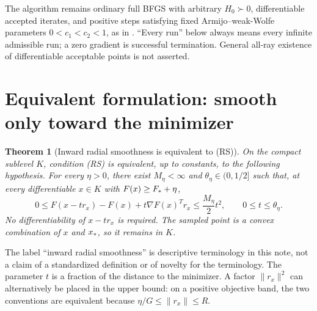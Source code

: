\documentclass[10pt,oneside,openany]{book}
\newtheorem{theorem}{Theorem}[chapter]
\theoremstyle{remark}\newtheorem{remark}{Remark}[chapter]
\begin{document}
The algorithm remains ordinary full BFGS with arbitrary $H_0\succ0$, differentiable accepted iterates, and positive steps satisfying fixed Armijo--weak-Wolfe parameters $0<c_1<c_2<1$, as in \cite{XW}. ``Every run'' below always means every infinite admissible run; a zero gradient is successful termination. General all-ray existence of differentiable acceptable points is not asserted.


\setcounter{section}{1}
\setcounter{theorem}{0}
\setcounter{equation}{1}
\section{Equivalent formulation: smooth only toward the minimizer}
\begin{theorem}[Inward radial smoothness is equivalent to (RS)]\label{R:thm:equiv}
On the compact sublevel $K$, condition (RS) is equivalent, up to constants, to the following hypothesis. For every $\eta>0$, there exist $M_\eta<\infty$ and $\theta_\eta\in(0,1/2]$ such that, at every differentiable $x\in K$ with $F(x)\ge F_*+\eta$,
\begin{equation}
 0\le F(x-t r_x)-F(x)+t\nabla F(x)^Tr_x
 \le \frac{M_\eta}{2}t^2,
 \qquad 0\le t\le\theta_\eta.
 \tag{R.IR}\label{R:eq:IR}
\end{equation}
No differentiability of $x-t r_x$ is required. The sampled point is a convex combination of $x$ and $x_*$, so it remains in $K$.
\end{theorem}
The label ``inward radial smoothness'' is descriptive terminology in this note, not a claim of a standardized definition or of novelty for the terminology. The parameter $t$ is a fraction of the distance to the minimizer. A factor $\|r_x\|^2$ can alternatively be placed in the upper bound: on a positive objective band, the two conventions are equivalent because $\eta/G\le\|r_x\|\le R$.
\end{document}
